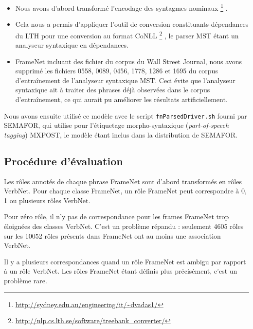 \begin{itemize}
    \item Nous avons d'abord transformé l'encodage des syntagmes nominaux
        \footnote{\url{http://sydney.edu.au/engineering/it/~dvadas1/}}
        \citep{vadas2007adding}.
    \item Cela nous a permis d'appliquer l'outil de conversion
        constituants-dépendances du LTH pour une conversion au format CoNLL
        \footnote{\url{http://nlp.cs.lth.se/software/treebank_converter/}}
        \citep{johansson2007extended}, le parser MST étant un analyseur
        syntaxique en dépendances.
    \item FrameNet incluant des fichier du corpus du Wall Street
        Journal, nous avons supprimé les fichiers 0558, 0089, 0456, 1778, 1286
        et 1695 du corpus d'entraînement de l'analyseur syntaxique MST. Ceci
        évite que l'analyseur syntaxique ait à traiter des phrases déjà
        observées dans le corpus d'entraînement, ce qui aurait pu améliorer les
        résultats artificiellement.
\end{itemize}

Nous avons ensuite utilisé ce modèle avec le script \verb=fnParsedDriver.sh=
fourni par SEMAFOR, qui utilise pour l'étiquetage morpho-syntaxique
(\textit{part-of-speech tagging}) MXPOST, le modèle étant inclus dans la
distribution de SEMAFOR.

\subsection{Procédure d'évaluation}

Les rôles annotés de chaque phrase FrameNet sont d'abord transformés en rôles
VerbNet. Pour chaque classe FrameNet, un rôle FrameNet peut correspondre à 0, 1
ou plusieurs rôles VerbNet.

Pour zéro rôle, il n'y pas de correspondance pour les frames FrameNet trop
éloignées des classes VerbNet. C'est un problème répandu : seulement 4605 rôles
sur les 10052 rôles présents dans FrameNet ont au moins une association
VerbNet.


Il y a plusieurs correspondances quand un rôle FrameNet est ambigu par rapport
à un rôle VerbNet. Les rôles FrameNet étant définis plus précisément, c'est un
problème rare.


